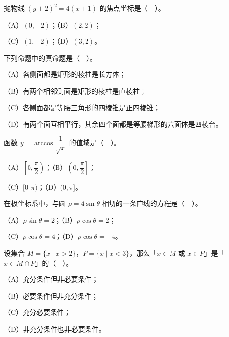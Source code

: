 \begin{question}
抛物线 $(y+2)^{2}=4(x+1)$ 的焦点坐标是（　）。

（A）$(0,-2)$；（B）$(2,2)$；

（C）$(1,-2)$；（D）$(3,2)$。

\end{question}
\begin{question}
下列命题中的真命题是（　）。

（A）各侧面都是矩形的棱柱是长方体；

（B）有两个相邻侧面是矩形的棱柱是直棱柱；

（C）各侧面都是等腰三角形的四棱锥是正四棱锥；

（D）有两个面互相平行，其余四个面都是等腰梯形的六面体是四棱台。

\end{question}
\begin{question}
函数 $y=\arccos\dfrac{1}{\sqrt{x}}$ 的值域是（　）。

（A）$\left[0,\dfrac{\pi}{2}\right)$；（B）$\left(0,\dfrac{\pi}{2}\right]$；

（C）$[0,\pi)$；（D）$(0,\pi]$。

\end{question}
\begin{question}
在极坐标系中，与圆 $\rho=4\sin\theta$ 相切的一条直线的方程是（　）。

（A）$\rho\sin\theta=2$；（B）$\rho\cos\theta=2$；

（C）$\rho\cos\theta=4$；（D）$\rho\cos\theta=-4$。

\end{question}
\begin{question}
设集合 $M=\{x\mid x>2\}$，$P=\{x\mid x<3\}$，那么「$x\in M$ 或 $x\in P$」是「$x\in M\cap P$」的（　）。

（A）充分条件但非必要条件；

（B）必要条件但非充分条件；

（C）充分必要条件；

（D）非充分条件也非必要条件。

\end{question}


